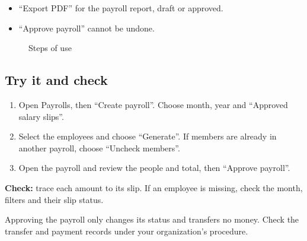 \begin{itemize}
  \item “Export PDF” for the payroll report, draft or approved.
  \item “Approve payroll” cannot be undone.
\end{itemize}

\begin{figure}[H]
\centering
{}
\rclegend
\caption{Steps of use}
\label{fig:hr-feature-payrolls-flow}
\end{figure}

\subsection{Try it and check}

\begin{enumerate}
  \item Open Payrolls, then “Create payroll”. Choose month, year and “Approved salary slips”.
  \item Select the employees and choose “Generate”. If members are already in another payroll, choose “Uncheck members”.
  \item Open the payroll and review the people and total, then “Approve payroll”.
\end{enumerate}

\textbf{Check:} trace each amount to its slip. If an employee is missing, check the month, filters and their slip status.

\begin{rcwarn}
Approving the payroll only changes its status and transfers no money. Check the transfer and payment records under your organization's procedure.
\end{rcwarn}
